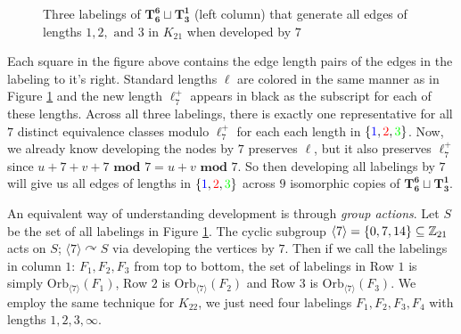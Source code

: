 \begin{figure}[H]
\begin{center}
    \end{center}
    \caption{Three labelings of $\mathbf{T_{6}^{6}}\sqcup \mathbf{T_{3}^{1}}$ (left column) that generate all edges of lengths $1,2,\text{ and }3$ in $K_{21}$ when developed by $7$}
    \label{fig:K21labelingex}
  \end{figure}

   Each square in the figure above contains the edge length pairs of the edges in the labeling to it's right. Standard lengths $\ell$ are colored in the same manner as in Figure \ref{fig:K21labelingex} and the new length $\ell_{7}^{+}$ appears in black as the subscript for each of these lengths. Across all three labelings, there is exactly one representative for all $7$ distinct equivalence classes modulo $\ell_{7}^{+}$ for each each length in $\{\textcolor{blue}{1},\textcolor{red}{2},\textcolor{green}{3}\}$. Now, we already know developing the nodes by $7$ preserves $\ell$, but it also preserves $\ell_{7}^{+}$ since $u+7+v+7\textbf{ mod }7=u+v\textbf{ mod }7$. So then developing all labelings by $7$ will give us all edges of lengths in $\{\textcolor{blue}{1},\textcolor{red}{2},\textcolor{green}{3}\}$ across $9$ isomorphic copies of $\mathbf{T_{6}^{6}}\sqcup \mathbf{T_{3}^{1}}$.
  
  An equivalent way of understanding development is through \textit{group actions}. Let $S$ be the set of all labelings in Figure \ref{fig:K21labelingex}. The cyclic subgroup $\langle 7\rangle=\{0,7,14\}\subseteq \mathbb{Z}_{21}$ acts on $S$; $\langle 7\rangle\curvearrowright S$ via developing the vertices by $7$. Then if we call the labelings in column $1$: $F_{1},F_{2},F_{3}$ from top to bottom, the set of labelings in Row $1$ is simply $\mathrm{Orb}_{\langle 7\rangle}(F_{1})$, Row $2$ is $\mathrm{Orb}_{\langle 7\rangle}(F_{2})$ and Row $3$ is $\mathrm{Orb}_{\langle 7 \rangle}(F_{3})$. We employ the same technique for $K_{22}$, we just need four labelings $F_{1},F_{2},F_{3},F_{4}$ with lengths $1,2,3,\infty$.


